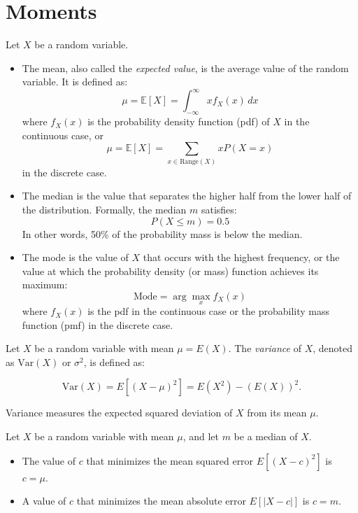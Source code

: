 \section{Moments}

Let \( X \) be a random variable. 

\begin{definition}
    \begin{itemize}
        \item The mean, also called the \textit{expected value}, is the average value of the random variable. It is defined as:
        \[
        \mu = \mathbb{E}[X] = \int_{-\infty}^{\infty} x f_X(x) \, dx
        \]
        where \( f_X(x) \) is the probability density function (pdf) of \( X \) in the continuous case, or
        \[
        \mu = \mathbb{E}[X] = \sum_{x \in \text{Range}(X)} x P(X = x)
        \]
        in the discrete case.
        \item  The median is the value that separates the higher half from the lower half of the distribution. Formally, the median \( m \) satisfies:
        \[
        P(X \leq m) = 0.5
        \]
        In other words, 50\% of the probability mass is below the median. 
        \item The mode is the value of \( X \) that occurs with the highest frequency, or the value at which the probability density (or mass) function achieves its maximum:
        \[
        \text{Mode} = \arg \max_x f_X(x)
        \]
        where \( f_X(x) \) is the pdf in the continuous case or the probability mass function (pmf) in the discrete case.
    \end{itemize}
\end{definition}

\begin{definition}
    Let \( X \) be a random variable with mean \( \mu = E(X) \). The \textit{variance} of \( X \), denoted as \( \text{Var}(X) \) or \( \sigma^2 \), is defined as:

\[
\text{Var}(X) = E\left[(X - \mu)^2\right] = E(X^2) - \left(E(X)\right)^2.
\]
\end{definition}

Variance measures the expected squared deviation of \( X \) from its mean \( \mu \).

\begin{theorem}
    Let \( X \) be a random variable with mean \( \mu \), and let \( m \) be a median of \( X \).
\begin{itemize}
    \item The value of \( c \) that minimizes the mean squared error \( E[(X - c)^2] \) is \( c = \mu \).
    \item A value of \( c \) that minimizes the mean absolute error \( E[|X - c|] \) is \( c = m \).
\end{itemize}
\end{theorem}

